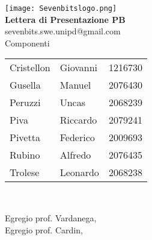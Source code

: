 \documentclass[10pt]{article}
\begin{document}
\begin{titlepage}
    \setcounter{page}{0}
    \centering
    \texttt{[image: Sevenbitslogo.png]} \\[2cm] 
    
     {\fontsize{30}{30}\bfseries Lettera di Presentazione PB}\selectfont \\[3em]
    {\large sevenbits.swe.unipd@gmail.com} \\[3em]
    
    {\huge Componenti} \\[2.7em]
    {\large 
     \begin{tabular}{l l l}
       Cristellon & Giovanni & 1216730\\
       Gusella & Manuel & 2076430\\
       Peruzzi & Uncas & 2068239\\
       Piva & Riccardo & 2079241\\
       Pivetta & Federico & 2009693\\
       Rubino & Alfredo & 2076435\\
       Trolese & Leonardo & 2068238\\ 
     \end{tabular}
    } \\[3em]
    
    \hfill
      
        
\vfill %
\end{titlepage}
\newpage
\noindent
Egregio prof. Vardanega,\\
Egregio prof. Cardin,\\
\end{document}
